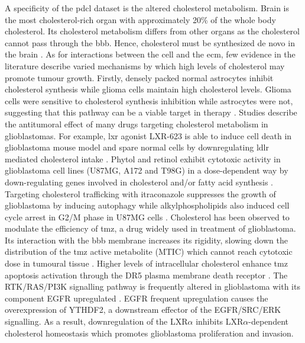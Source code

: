A specificity of the \acrshort{pdcl} dataset is the altered cholesterol metabolism.
Brain is the most cholesterol-rich organ with approximately 20\% of the whole body cholesterol.
Its cholesterol metabolism differs from other organs as the cholesterol cannot pass through the \acrfull{bbb}.
Hence, cholesterol must be synthesized de novo in the brain \cite*{Villa2016,Yamamoto2018,Pirmoradi2019}.
As for interactions between the cell and the \acrlong{ecm}, few evidence in the literature describe varied mechanisms by which high levels of cholesterol may promote tumour growth.
Firstly, densely packed normal astrocytes inhibit cholesterol synthesis while glioma cells maintain high cholesterol levels.
Glioma cells were sensitive to cholesterol synthesis inhibition while astrocytes were not, suggesting that this pathway can be a viable target in therapy \cite*{Kambach2017}.
Studies describe the antitumoral effect of many drugs targeting cholesterol metabolism in glioblastomas.
For example, \acrfull{lxr} agonist LXR-623 is able to induce cell death in glioblastoma mouse model and spare normal cells by downregulating \acrfull{ldlr} mediated cholesterol intake \cite*{Villa2016, Pirmoradi2019}.
Phytol and retinol exhibit cytotoxic activity in glioblastoma cell lines (U87MG, A172 and T98G) in a dose-dependent way by down-regulating genes involved in cholesterol and/or fatty acid synthesis \cite*{Facchini2018}.
Targeting cholesterol trafficking with itraconazole suppresses the growth of glioblastoma by inducing autophagy \cite*{Liu2014} while alkylphospholipids also induced cell cycle arrest in G2/M phase in U87MG cells \cite*{Rios-Marco2013}.
Cholesterol has been observed to modulate the efficiency of \acrfull{tmz}, a drug widely used in treatment of glioblastoma.
Its interaction with the \acrshort{bbb} membrane increases its rigidity, slowing down the distribution of the \acrshort{tmz} active metabolite (MTIC) which cannot reach cytotoxic dose in tumoural tissue \cite*{Ramalho2019}.
Higher levels of intracellular cholesterol enhance \acrshort{tmz} apoptosis activation through the DR5 plasma membrane death receptor \cite*{Yamamoto2018}.
The RTK/RAS/PI3K signalling pathway is frequently altered in glioblastoma with its component EGFR upregulated \cite*{McLendon2008}.
EGFR frequent upregulation causes the overexpression of YTHDF2, a downstream effector of the EGFR/SRC/ERK signalling.
As a result, downregulation of the LXR$\alpha$ inhibits LXR$\alpha$-dependent cholesterol homeostasis which promotes glioblastoma proliferation and invasion.

